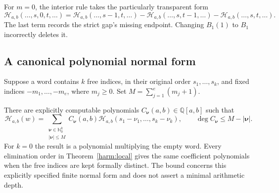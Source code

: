 For $m=0$, the interior rule takes the particularly transparent form
\begin{equation}
 \mathcal H_{a,b}(\ldots,s,0,t,\ldots)
 =\mathcal H_{a,b}(\ldots,s-1,t,\ldots)
  -\mathcal H_{a,b}(\ldots,s,t-1,\ldots)
  -\mathcal H_{a,b}(\ldots,s,t,\ldots).
 \label{harm:zero}
\end{equation}
The last term records the strict gap's missing endpoint. Changing
$B_1(1)$ to $B_1$ incorrectly deletes it.

\subsection{A canonical polynomial normal form}

Suppose a word contains $k$ free indices, in their original order
$s_1,\ldots,s_k$, and fixed indices $-m_1,\ldots,-m_e$, where
$m_j\ge0$. Set $M=\sum_{j=1}^e(m_j+1)$.

\begin{theorem}
\label{harm:normalform}
There are explicitly computable polynomials $C_{\boldsymbol\nu}(a,b)
\in\mathbb Q[a,b]$ such that
\begin{equation}
 \boxed{\displaystyle
 \mathcal H_{a,b}(w)=
  \sum_{\substack{\boldsymbol\nu\in\mathbb N_0^k\\
                    |\boldsymbol\nu|\le M}}
  C_{\boldsymbol\nu}(a,b)
  \mathcal H_{a,b}(s_1-\nu_1,\ldots,s_k-\nu_k),\qquad
 \deg C_{\boldsymbol\nu}\le M-|\boldsymbol\nu|.}
 \label{harm:normalform-eq}
\end{equation}
For $k=0$ the result is a polynomial multiplying the empty word.
Every elimination order in Theorem~\ref{harm:local} gives the same
coefficient polynomials when the free indices are kept formally
distinct. The bound concerns this explicitly specified finite normal
form and does not assert a minimal arithmetic depth.
\end{theorem}

